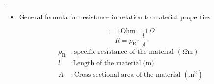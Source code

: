 \begin{frame}
	\b{
	
		\begin{itemize}
			\item General formula for resistance in relation to material properties
		\end{itemize}
		\vspace{1cm}
		\begin{equation*}
			[R] = 1\, \text{Ohm} = 1\, \text{$\Omega$}
		\end{equation*}
		\vspace{0.1cm}
		\begin{equation*}
			R = \rho_\mathrm{R} \cdot \frac{l}{A}
		\end{equation*}
		\begin{align*}
			\rho_\mathrm{R} & : \text{specific resistance of the material } (\Omega \text{m}) \\
			l               & : \text{Length of the material (m)}                                  \\
			A               & : \text{Cross-sectional area of the material } (\text{m}^2)           \\
		\end{align*}
		
}
\end{frame}
